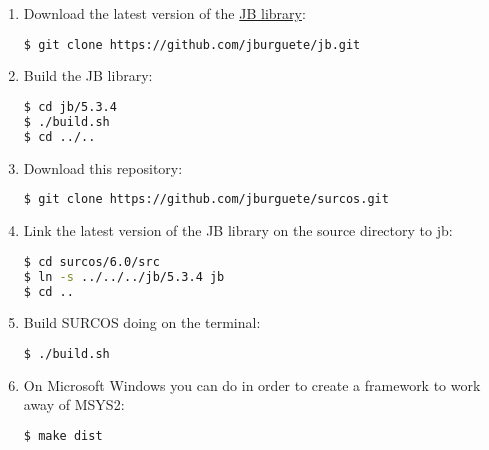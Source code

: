 \begin{enumerate}

\item Download the latest version of the
\href{https://github.com/jburguete/jb}{JB library}:
\begin{lstlisting}[language=bash]
$ git clone https://github.com/jburguete/jb.git
\end{lstlisting}

\item Build the JB library:
\begin{lstlisting}[language=bash]
$ cd jb/5.3.4
$ ./build.sh
$ cd ../..
\end{lstlisting}

\item Download this repository:
\begin{lstlisting}[language=bash]
$ git clone https://github.com/jburguete/surcos.git
\end{lstlisting}

\item Link the latest version of the JB library on the source directory to jb:
\begin{lstlisting}[language=bash]
$ cd surcos/6.0/src
$ ln -s ../../../jb/5.3.4 jb
$ cd ..
\end{lstlisting}

\item Build SURCOS doing on the terminal:
\begin{lstlisting}[language=bash]
$ ./build.sh
\end{lstlisting}

\item On Microsoft Windows you can do in order to create a framework to work
away of MSYS2:
\begin{lstlisting}[language=bash]
$ make dist
\end{lstlisting}

\end{enumerate}
